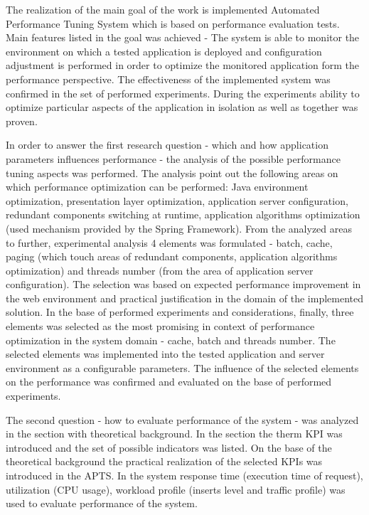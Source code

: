 \documentclass[12pt,a4paper]{article}
\begin{document}
The realization of the main goal of the work is implemented Automated Performance Tuning System which is based on performance evaluation tests. Main features listed in the goal was achieved - The system is able to monitor the environment on which a tested application is deployed and configuration adjustment is performed in order to optimize the monitored application form the performance perspective. The effectiveness of the implemented system was confirmed in the set of performed experiments. During the experiments ability to optimize particular aspects of the application in isolation as well as together was proven. 

In order to answer the first research question - which and how application parameters influences performance - the analysis of the possible performance tuning aspects was performed. The analysis point out the following areas on which performance optimization can be performed: Java environment optimization, presentation layer optimization, application server configuration, redundant components switching at runtime, application algorithms  optimization (used mechanism provided by the Spring Framework). From the analyzed areas to further, experimental analysis 4 elements was formulated - batch, cache, paging (which touch areas of redundant components, application algorithms optimization) and threads number (from the area of application server configuration). The selection was based on expected performance improvement in the web environment and practical justification in the domain of the implemented solution. In the base of performed experiments and considerations, finally, three elements was selected as the most promising in context of performance optimization in the system domain - cache, batch and threads number. The selected elements was implemented into the tested application and server environment as a configurable parameters. The influence of the selected elements on the performance was confirmed and evaluated on the base of performed experiments. 

The second question - how to evaluate performance of the system - was analyzed in the section with theoretical background. In the section the therm KPI was introduced and the set of possible indicators was listed. On the base of the theoretical background the practical realization of the selected KPIs was introduced in the APTS. In the system response time (execution time of request), utilization (CPU usage), workload profile (inserts level and traffic profile) was used to evaluate performance of the system.
\end{document}
